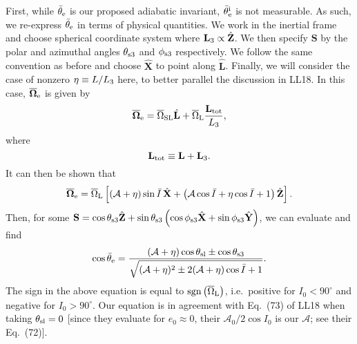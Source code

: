 \documentclass[
        twocolumn,
        twocolappendix
    ]{aastex63}
\renewcommand*{\bm}[1]{\boldsymbol{\mathbf{#1}}}
\newcommand*{\uv}[1]{\hat{\bm{#1}}}
\newcommand*{\p}[1]{\left(#1\right)}
\newcommand*{\s}[1]{\left[#1\right]}
\begin{document}
First, while $\bar{\theta}_{\rm e}$ is our proposed adiabatic invariant,
$\bar{\theta}_{\rm e}^{\rm i}$ is not measurable. As such, we re-express
$\bar{\theta}_{\rm e}$ in terms of physical quantities. We work in the
inertial frame and choose spherical coordinate system where $\bm{L}_{\rm 3}
\propto \uv{Z}$. We then specify $\bm{S}$ by the polar and azimuthal angles
$\theta_{\rm s3}$ and $\phi_{ \rm s3}$ respectively. We follow the same
convention as before and choose $\uv{X}$ to point along $\uv{L}$. Finally, we
will consider the case of nonzero $\eta \equiv L / L_{\rm 3}$ here, to better
parallel the discussion in LL18. In this case, $\bm{\overline{\Omega}}_{\rm e}$
is given by \citep{bin1}
\begin{equation}
    \bm{\overline{\Omega}}_{\rm e} = \overline{\Omega}_{\rm SL} \uv{L}
        + \overline{\Omega}_{\rm L}\frac{\bm{L}_{\rm tot}}{L_3},
\end{equation}
where
\begin{equation}
    \bm{L}_{\rm tot} \equiv \bm{L} + \bm{L}_{\rm 3}.
\end{equation}
It can then be shown that
\begin{equation}
    \bm{\overline{\Omega}}_{\rm e} = \overline{\Omega}_{\rm L}\s{\p{
        \mathcal{A} + \eta}\sin \bar{I}\,\uv{X} + \p{\mathcal{A}\cos \bar{I} +
        \eta\cos \bar{I} + 1} \uv{Z}}.
\end{equation}
Then, for some $\bm{S} = \cos \theta_{\rm s3} \uv{Z} + \sin \theta_{\rm
s3}\p{\cos \phi_{\rm s3}\uv{X} + \sin \phi_{\rm s3}\uv{Y}}$, we can evaluate and
find
\begin{equation}
    \cos \bar{\theta}_{\rm e} =
        \frac{\p{\mathcal{A} + \eta}\cos \theta_{\rm sl} \pm \cos \theta_{\rm
        s3}}{\sqrt{(\mathcal{A} + \eta)^2 \pm 2(\mathcal{A} + \eta)\cos \bar{I}
            + 1}}.\label{eq:cos_qe_explicit}
\end{equation}
The sign in the above equation is equal to
$\mathrm{sgn}\p{\overline{\Omega}_{\rm L}}$, i.e.\ positive for $I_0 < 90^\circ$
and negative for $I_0 > 90^\circ$. Our equation is in agreement with Eq.~(73) of
LL18 when taking $\theta_{\rm sl} = 0$ [since they evaluate for $e_0 \approx 0$,
their $\mathcal{A}_0 / 2 \cos I_0$ is our $\mathcal{A}$; see their Eq.~(72)].
\end{document}
